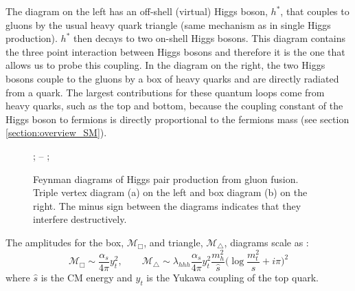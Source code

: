 
The diagram on the left has an off-shell (virtual) Higgs boson, $h^*$, that couples to gluons by the usual heavy quark triangle (same mechanism as in single Higgs production). $h^*$  then decays to two on-shell Higgs bosons. This diagram contains the three point interaction between Higgs bosons and therefore it is the one that allows us to probe this coupling. In the diagram on the right, the two Higgs bosons couple to the gluons by a box of heavy quarks and are directly radiated from a quark. The largest contributions for these quantum loops come from heavy quarks, such as the top and bottom, because the coupling constant of the Higgs boson to fermions is directly proportional to the fermions mass (see section \ref{section:overview_SM}).

\begin{figure}[h]
	\centering
	; \qquad \--- \qquad
	;
	\caption{Feynman diagrams of Higgs pair production from gluon fusion. Triple vertex diagram (a) on the left and box diagram (b) on the right. The minus sign between the diagrams indicates that they interfere destructively.}
	\label{fig:higgs_pair}
\end{figure}


The amplitudes for the box, $\mathcal{M}_{\Box}$, and triangle, $\mathcal{M}_{\triangle}$, diagrams scale as \cite{FCCyellow}:
\begin{equation}
\mathcal{M}_{\Box} \sim \frac{\alpha_s}{4\pi} y_t^2, \qquad \mathcal{M}_{\triangle} \sim \lambda_{hhh} \frac{\alpha_s}{4\pi} y_t^2 \frac{m_h^2}{\hat{s}}\Big(\log \frac{m_t^2}{\hat{s}} + i\pi\Big)^2
\label{eq:hh_M}
\end{equation}
where $\hat{s}$ is the CM energy and $y_t$ is the Yukawa coupling of the top quark.

